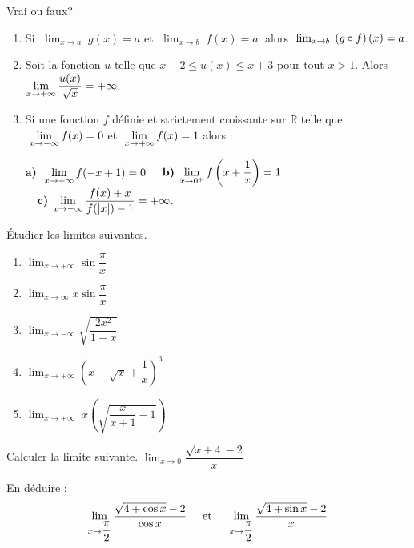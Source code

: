 
\everymath{\displaystyle}


  \summary{}
  \begin{exercice}
     Vrai ou faux?
      \begin{enumerate}
      \item Si   $ \;\displaystyle\lim_{x \to a}\; g(x)=a $ \; et \;  $\; \displaystyle\lim_{x \to b}\; f(x)=a \;$\;  alors  \;  $\; \lim_{x \to b}\; \left(g \circ f\right)(x)=a $.
       \item Soit la fonction $ u $  telle que $ x-2\leq u(x)\leq x+3 $  pour tout $  x>1 $.  Alors $\displaystyle \lim_{x\to +\infty}\dfrac{u(x)}{\sqrt{x}}=+\infty $.
       \item  Si une fonction  $ f $ définie et  strictement croissante  sur $ \mathbb{R} $ telle que: $ \;\displaystyle\lim_{x \to -\infty}f(x)=0$  et $\;\displaystyle \lim_{x \to +\infty}f(x)=1$ alors :

\medskip

\textbf{a)} $ \;\displaystyle\lim_{x \to +\infty}f(-x+1)=0$   $\quad \textbf{b)} \;\displaystyle\lim_{x \to 0^{+}}f\left(x+\frac{1}{x}\right)=1$  $ \quad \textbf{c)}\;\displaystyle\lim_{x \to -\infty}\frac{f(x)+x}{f(|x|)-1}=+\infty$.


       \end{enumerate}
\end{exercice}
  \begin{exercice}
      Étudier les limites suivantes.
      \begin{enumerate}
\item  $ \displaystyle \lim_{x \to +\infty}{\sin \dfrac{\pi}{x}}$
 \item $\displaystyle \lim_{x \to \infty}{x\sin \dfrac{\pi}{x}}$
\item $ \displaystyle \lim_{x \to -\infty}{\sqrt{\dfrac{2x^2}{1-x}}}$
\item $ \displaystyle \lim_{x \to+\infty}\left(x-\sqrt{x}+\dfrac{1}{x}\right)^3$
\item $ \displaystyle \lim_{x \to +\infty} \; x\left(\sqrt{\dfrac{x}{x+1}-1}\right)$
 \end{enumerate}
\end{exercice}
  \begin{exercice}
        Calculer la limite suivante.
     $ \displaystyle \lim_{x \to 0} \dfrac{\sqrt{x+4}-2}{x}$ 
     
       En déduire :
        $$ \displaystyle \lim_{x \to \dfrac{\pi}{2}} \dfrac{\sqrt{4+\cos x}-2}{\cos x}\hspace*{0.5cm}\text{et}\hspace*{0.5cm}
       \displaystyle \lim_{x \to \dfrac{\pi}{2}} \dfrac{\sqrt{4+\sin x}-2}{ x}$$
        \end{exercice}
